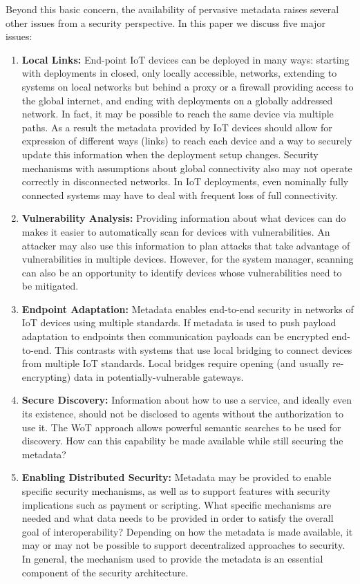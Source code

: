 Beyond this basic concern,
the availability of pervasive metadata raises several other issues
from a security perspective.
In this paper we discuss five major issues:
\begin{enumerate}
\item \textbf{Local Links:}
End-point IoT devices can be deployed in many ways: 
starting with deployments in closed, only locally accessible,
networks, extending to systems on local networks but behind a proxy or a firewall 
providing access to the global internet, and ending with deployments on a globally addressed network. 
In fact, it may be possible to reach the same device via multiple paths.
As a result the metadata provided by IoT devices should allow for expression of
different ways (links) to reach each device 
and a way to securely update this information when the deployment setup changes. 
Security mechanisms with assumptions about global connectivity also may not
operate correctly in disconnected networks.
In IoT deployments, even nominally fully connected systems may have to 
deal with frequent loss of full connectivity.
\item \textbf{Vulnerability Analysis:}
Providing information about what devices can do makes it easier to 
automatically scan for devices with vulnerabilities.
An attacker may also use this information to plan attacks that take advantage of 
vulnerabilities in multiple devices. 
However, for the system manager, scanning can also be an opportunity 
to identify devices whose vulnerabilities need to be mitigated.
\item \textbf{Endpoint Adaptation:}
Metadata enables end-to-end security in networks of IoT devices using multiple standards.
If metadata is used to push payload adaptation to endpoints then 
communication payloads can be encrypted end-to-end.  
This contrasts with systems that use local bridging to connect devices from multiple IoT standards.
Local bridges require opening (and usually re-encrypting) data in potentially-vulnerable gateways.
\item \textbf{Secure Discovery:}
Information about how to use a service, 
and ideally even its existence, should not
be disclosed to agents without the authorization to use it.
The WoT approach allows powerful semantic searches to be used for discovery.
How can this capability be made available while still securing the metadata?
\item \textbf{Enabling Distributed Security:}
Metadata may be provided to enable specific security mechanisms,
as well as to support features with security implications such as payment or scripting.
What specific mechanisms are needed and what data needs to be provided
in order to satisfy the overall goal of interoperability?
Depending on how the metadata is made available, it may or may not be 
possible to support decentralized approaches to security.
In general, the mechanism used to provide the metadata is
an essential component of the security architecture.
\end{enumerate}

